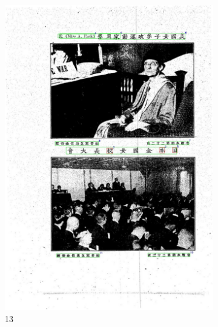 \documentclass[12pt,twoside]{report}
\begin{document}
\begin{figure}[htbp]
\begin{subfigure}[b]{0.3\linewidth}
        \includegraphics[height=1.35\linewidth]{./figures/samples/13.jpg}
        \caption{13}
        \label{fig:ours_13}
    \end{subfigure}
    \hfill
    \begin{subfigure}[b]{0.3\linewidth}

\end{subfigure}
\end{figure}
\end{document}
